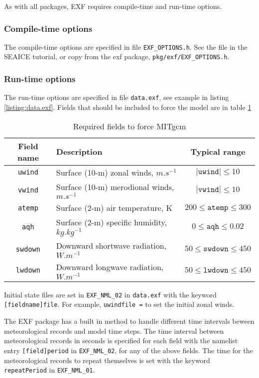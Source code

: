 \documentclass[11pt]{article}
\begin{document}
As with all packages, EXF requires compile-time and run-time options.

\subsubsection*{Compile-time options}
The compile-time options are specified in file \verb|EXF_OPTIONS.h|. See the file in the SEAICE tutorial, or copy from the exf package, \verb|pkg/exf/EXF_OPTIONS.h|.

\subsubsection*{Run-time options}
The run-time options are specified in file \verb|data.exf|, see example in listing \ref{listing:data.exf}. Fields that should be included to force the model are in table \ref{table:EXFfields}

\begin{table}[h!]
\begin{tabularx}{\textwidth}{ |c|X|c| }
\hline
Field name &  Description & Typical range \\ \hline
\texttt{uwind}& Surface (10-m) zonal winds, $\si{m.s^{-1}}$ & $\left| \texttt{uwind} \right| \leq 10$ \\
\texttt{vwind} & Surface (10-m) merodional winds, $\si{m.s^{-1}}$ & $\left| \texttt{vwind} \right| \leq 10$ \\
\texttt{atemp} & Surface (2-m) air temperature, $\si{\kelvin}$ & $200 \leq \texttt{atemp} \leq 300$ \\
\texttt{aqh} & Surface (2-m) specific humidity, $\si{kg.kg^{-1}}$ & $0 \leq \texttt{aqh} \leq 0.02$ \\
\texttt{swdown} & Downward shortwave radiation, $\si{W.m^{-1}}$ & $50 \leq \texttt{swdown} \leq450$ \\
\texttt{lwdown} & Downward longwave radiation, $\si{W.m^{-1}}$ & $50 \leq \texttt{lwdown} \leq450$ \\

\hline
\end{tabularx}
\caption{Required fields to force MITgcm}
\label{table:EXFfields}
\end{table}

Initial state files are set in \verb|EXF_NML_02| in \verb|data.exf| with the keyword \verb|[fieldname]file|. For example, \verb|uwindfile =| to set the initial zonal winds.

The EXF package has a built in method to handle different time intervals beween meteorological records and model time steps. The time interval between meteorological records in seconds is specified for each field with the namelist entry \verb|[field]period| in \verb|EXF_NML_02|, for any of the above fields. The time for the meteorological records to repeat themselves is set with the keyword \verb|repeatPeriod| in \verb|EXF_NML_01|.
\end{document}
